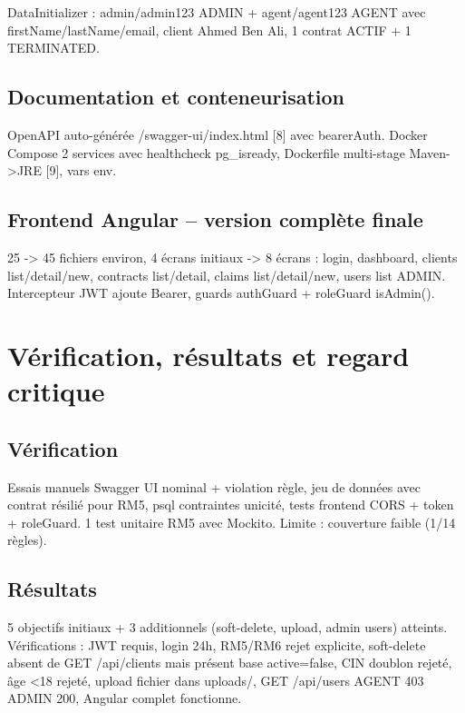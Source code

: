 \documentclass[a4paper,12pt]{article}
\newcommand{\refbib}[1]{[#1]}
\begin{document}
DataInitializer : admin/admin123 ADMIN + agent/agent123 AGENT avec firstName/lastName/email, client Ahmed Ben Ali, 1 contrat ACTIF + 1 TERMINATED.

\subsection{Documentation et conteneurisation}
OpenAPI auto-générée /swagger-ui/index.html \refbib{8} avec bearerAuth. Docker Compose 2 services avec healthcheck pg\_isready, Dockerfile multi-stage Maven->JRE \refbib{9}, vars env.

\subsection{Frontend Angular -- version complète finale}
25 -> 45 fichiers environ, 4 écrans initiaux -> 8 écrans : login, dashboard, clients list/detail/new, contracts list/detail, claims list/detail/new, users list ADMIN. Intercepteur JWT ajoute Bearer, guards authGuard + roleGuard isAdmin().

\section{Vérification, résultats et regard critique}
\subsection{Vérification}
Essais manuels Swagger UI nominal + violation règle, jeu de données avec contrat résilié pour RM5, psql contraintes unicité, tests frontend CORS + token + roleGuard. 1 test unitaire RM5 avec Mockito. Limite : couverture faible (1/14 règles).

\subsection{Résultats}
5 objectifs initiaux + 3 additionnels (soft-delete, upload, admin users) atteints. Vérifications : JWT requis, login 24h, RM5/RM6 rejet explicite, soft-delete absent de GET /api/clients mais présent base active=false, CIN doublon rejeté, âge <18 rejeté, upload fichier dans uploads/, GET /api/users AGENT 403 ADMIN 200, Angular complet fonctionne.
\end{document}
